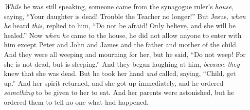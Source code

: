 \begin{biblechapter}
\verse \textit{While} he was still speaking, someone came from the synagogue ruler’s \textit{house}, saying, “Your daughter is dead! Trouble the Teacher no longer!”
\verse But Jesus, \textit{when he} heard \textit{this}, replied to him, “Do not be afraid! Only believe, and she will be healed.”
\verse Now \textit{when he} came to the house, he did not allow anyone to enter with him except Peter and John and James and the father and mother of the child.
\verse And they were all weeping and mourning for her, but he said, “Do not weep! For she is not dead, but is sleeping.”
\verse And they began laughing at him, \textit{because they} knew that she was dead.
\verse But he took her hand \textit{and} called, saying, “Child, get up.”
\verse And her spirit returned, and she got up immediately, and he ordered \textit{something} to be given to her to eat.
\verse And her parents were astonished, but he ordered them to tell no one what had happened.
\end{biblechapter}

